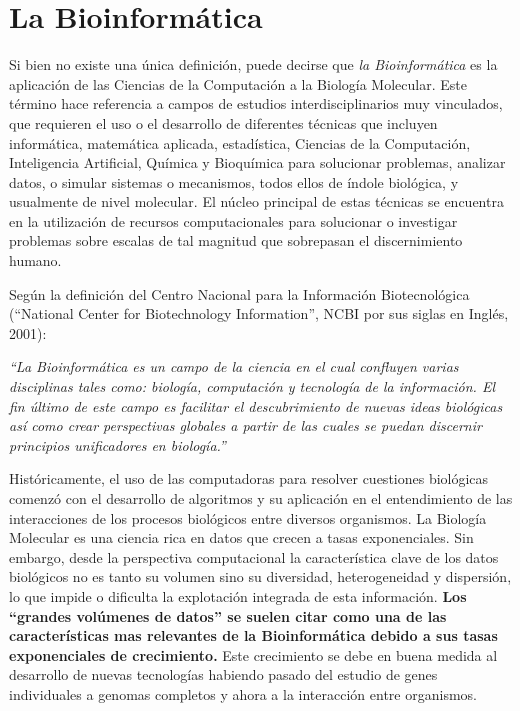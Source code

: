 \section*{La Bioinformática}
\par Si bien no existe una única definición, puede decirse que \emph{la Bioinformática} es la aplicación de las Ciencias de la Computación a la Biología Molecular. Este término hace referencia a campos de estudios interdisciplinarios muy vinculados, que requieren el uso o el desarrollo de diferentes técnicas que incluyen informática, matemática aplicada, estadística, Ciencias de la Computación, Inteligencia Artificial, Química y Bioquímica para solucionar problemas, analizar datos, o simular sistemas o mecanismos, todos ellos de índole biológica, y usualmente de nivel molecular. El núcleo principal de estas técnicas se encuentra en la utilización de recursos computacionales para solucionar o investigar problemas sobre escalas de tal magnitud que sobrepasan el discernimiento humano. 
\par Según la definición del Centro Nacional para la Información Biotecnológica (``National Center for Biotechnology Information'', NCBI por sus siglas en Inglés, 2001):
\begin{center}
\emph{``La Bioinformática es un campo de la ciencia en el cual confluyen varias disciplinas tales como: biología, computación y tecnología de la información. El fin último de este campo es facilitar el descubrimiento de nuevas ideas biológicas así como crear perspectivas globales a partir de las cuales se puedan discernir principios unificadores en biología.''}
\end{center}

\par Históricamente, el uso de las computadoras para resolver cuestiones biológicas comenzó con el desarrollo de algoritmos y su aplicación en el entendimiento de las interacciones de los procesos biológicos entre diversos organismos. La Biología Molecular es una ciencia rica en datos que crecen a tasas exponenciales\cite{NCBI}. Sin embargo, desde la perspectiva computacional la característica clave de los datos biológicos no es tanto su volumen sino su diversidad, heterogeneidad y dispersión, lo que impide o dificulta la explotación integrada de esta información.
\textbf{Los ``grandes volúmenes de datos'' se suelen citar como una de las características mas relevantes de la Bioinformática debido a sus tasas exponenciales de crecimiento.} Este crecimiento se debe en buena medida al desarrollo de nuevas tecnologías habiendo pasado del estudio de genes individuales a genomas completos y ahora a la interacción entre organismos.

